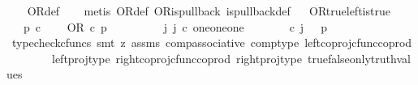 \begin{isabellebody}
%
\isadelimproof
\ \ %
\endisadelimproof
%
\isatagproof
{}\isamarkupfalse%
\ OR{\isacharunderscore}{\kern0pt}def\isanewline
\ \ \isamarkupfalse%
\ {\isacharparenleft}{\kern0pt}metis\ OR{\isacharunderscore}{\kern0pt}def\ OR{\isacharunderscore}{\kern0pt}is{\isacharunderscore}{\kern0pt}pullback\ is{\isacharunderscore}{\kern0pt}pullback{\isacharunderscore}{\kern0pt}def{\isacharparenright}{\kern0pt}%
\endisatagproof
{\isafoldproof}%
%
\isadelimproof
\ \isanewline
%
\endisadelimproof
\isanewline
{}\isamarkupfalse%
\ OR{\isacharunderscore}{\kern0pt}true{\isacharunderscore}{\kern0pt}left{\isacharunderscore}{\kern0pt}is{\isacharunderscore}{\kern0pt}true{\isacharcolon}{\kern0pt}\isanewline
\ \ \ {\isachardoublequoteopen}p\ {\isasymin}\isactrlsub c\ {\isasymOmega}{\isachardoublequoteclose}\isanewline
\ \ \ {\isachardoublequoteopen}OR\ {\isasymcirc}\isactrlsub c\ {\isasymlangle}{\isasymt}{\isacharcomma}{\kern0pt}p{\isasymrangle}\ {\isacharequal}{\kern0pt}\ {\isasymt}{\isachardoublequoteclose}\isanewline
%
\isadelimproof
%
\endisadelimproof
%
\isatagproof
{}\isamarkupfalse%
\ {\isacharminus}{\kern0pt}\ \isanewline
\ \ \isamarkupfalse%
\ {\isachardoublequoteopen}{\isasymexists}\ j{\isachardot}{\kern0pt}\ j\ {\isasymin}\isactrlsub c\ one{\isasymCoprod}{\isacharparenleft}{\kern0pt}one{\isasymCoprod}one{\isacharparenright}{\kern0pt}\ {\isasymand}\ {\isacharparenleft}{\kern0pt}{\isasymlangle}{\isasymt}{\isacharcomma}{\kern0pt}\ {\isasymt}{\isasymrangle}{\isasymamalg}\ {\isacharparenleft}{\kern0pt}{\isasymlangle}{\isasymt}{\isacharcomma}{\kern0pt}\ {\isasymf}{\isasymrangle}\ {\isasymamalg}{\isasymlangle}{\isasymf}{\isacharcomma}{\kern0pt}\ {\isasymt}{\isasymrangle}{\isacharparenright}{\kern0pt}{\isacharparenright}{\kern0pt}\ {\isasymcirc}\isactrlsub c\ j\ \ {\isacharequal}{\kern0pt}\ {\isasymlangle}{\isasymt}{\isacharcomma}{\kern0pt}p{\isasymrangle}{\isachardoublequoteclose}\isanewline
\ \ \ \ \isamarkupfalse%
\ {\isacharparenleft}{\kern0pt}typecheck{\isacharunderscore}{\kern0pt}cfuncs{\isacharcomma}{\kern0pt}\ smt\ {\isacharparenleft}{\kern0pt}z{}{\isacharparenright}{\kern0pt}\ assms\ comp{\isacharunderscore}{\kern0pt}associative{}\ comp{\isacharunderscore}{\kern0pt}type\ left{\isacharunderscore}{\kern0pt}coproj{\isacharunderscore}{\kern0pt}cfunc{\isacharunderscore}{\kern0pt}coprod\isanewline
\ \ \ \ \ \ \ \ left{\isacharunderscore}{\kern0pt}proj{\isacharunderscore}{\kern0pt}type\ right{\isacharunderscore}{\kern0pt}coproj{\isacharunderscore}{\kern0pt}cfunc{\isacharunderscore}{\kern0pt}coprod\ right{\isacharunderscore}{\kern0pt}proj{\isacharunderscore}{\kern0pt}type\ true{\isacharunderscore}{\kern0pt}false{\isacharunderscore}{\kern0pt}only{\isacharunderscore}{\kern0pt}truth{\isacharunderscore}{\kern0pt}values{\isacharparenright}{\kern0pt}\isanewline

\end{isabellebody}
